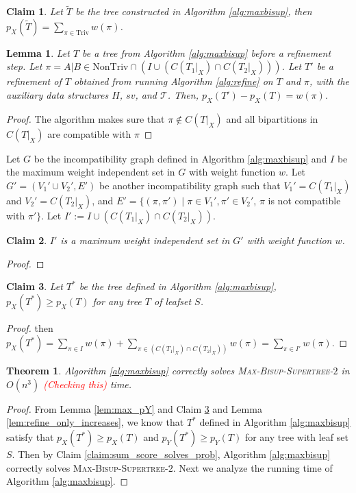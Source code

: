 \documentclass{bmcart}
\newcommand{\note}[1]{\textcolor{red}{#1}}
\newcommand{\triv}{\mathrm{Triv}}
\newcommand{\ntriv}{\mathrm{NonTriv}}
\newtheorem{theorem}{Theorem}
\newtheorem{lemma}{Lemma}
\newtheorem{claim}{Claim}
\begin{document}
\begin{claim}\label{claim:after_add_trivial}
    Let $\tilde{T}$ be the tree constructed in Algorithm \ref{alg:maxbisup}, then $p_X(\tilde{T}) = \sum_{\pi \in \triv} w(\pi)$. 
\end{claim}


\begin{lemma}\label{lem:refine_achieves_weight}
Let $T$ be a tree from Algorithm \ref{alg:maxbisup} before a refinement step. Let $\pi = A|B \in \ntriv \cap (I \cup (C(T_1|_X)\cap C(T_2|_X)))$. Let $T'$ be a refinement of $T$ obtained from running Algorithm \ref{alg:refine} on $T$ and $\pi$, with the auxiliary data structures $H$, $sv$, and $\mathcal{T}$. Then, $p_X(T') - p_X(T) = w(\pi)$. 
\end{lemma}
\begin{proof}
The algorithm makes sure that $\pi \notin C(T|_X)$ and all bipartitions in $C(T|_X)$ are compatible with $\pi$
\end{proof}


Let $G$ be the incompatibility graph defined in Algorithm \ref{alg:maxbisup} and $I$ be the maximum weight independent set in $G$ with weight function $w$. Let $G'= (V_1' \cup V_2',E')$ be another incompatibility graph such that $V_1' = C(T_1|_X)$ and $V_2' = C(T_2|_X)$, and $E' = \{(\pi, \pi') \mid \pi \in V_1', \pi' \in V_2'$, $\pi$ is not compatible with $\pi'\}$.  Let $I' := I \cup (C(T_1|_X )\cap C(T_2|_X))$.


\begin{claim}\label{claim:independent_sets_equivalence}
    $I'$ is a maximum weight independent set in $G'$ with weight function $w$. 
\end{claim}
\begin{proof}
\end{proof}

\begin{claim}\label{claim:after_add_all_bipars}
    Let $T^*$ be the tree defined in Algorithm \ref{alg:maxbisup}, $p_X(T^*) \ge p_X(T)$ for any tree $T$ of leafset $S$.
\end{claim}
\begin{proof}
then $p_X(T^*)= \sum_{\pi \in I} w(\pi) + \sum_{\pi \in (C(T_1|_X )\cap C(T_2|_X))} w(\pi) = \sum_{\pi \in I'}w(\pi)$.
\end{proof}

\begin{theorem}\label{thm:correctness_alg}
Algorithm \ref{alg:maxbisup} correctly solves \textsc{Max-Bisup-Supertree-$2$} in $O(n^3)$ \note{(Checking this)} time.
\end{theorem}
\begin{proof}
From Lemma \ref{lem:max_pY} and Claim \ref{claim:after_add_all_bipars} and Lemma \ref{lem:refine_only_increases}, we know that $T^*$ defined in Algorithm \ref{alg:maxbisup} satisfy that $p_X(T^*) \ge p_X(T)$ and $p_Y(T^*) \ge p_Y(T)$ for any tree with leaf set $S$. Then by Claim \ref{claim:sum_score_solves_prob}, Algorithm \ref{alg:maxbisup} correctly solves \textsc{Max-Bisup-Supertree-$2$}. Next we analyze the running time of Algorithm \ref{alg:maxbisup}.
\end{proof}
\end{document}
